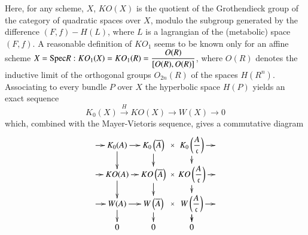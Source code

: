 Here, for any scheme, $X$, $KO(X)$ is the quotient of the Grothendieck group of the category of quadratic spaces over $X$, modulo the subgroup generated by the difference $(F,f)-H(L)$, where $L$ is a lagrangian of the (metabolic) space $(F,f)$. A reasonable definition of $KO_1$ seems to be known only for an affine scheme $X=\mathrm{Spec} R:KO_1(X)=KO_1(R)=\dfrac{O(R)}{[O(R),O(R)]}$, where $O(R)$ denotes the inductive limit of the orthogonal groups $O_{2n}(R)$ of the spaces $H(R^{n})$. Associating to every bundle $P$ over $X$ the hyperbolic space $H(P)$ yields an exact sequence 
$$
K_0(X)\xrightarrow{H}KO(X)\to W(X)\to 0
$$
which, combined with the Mayer-Vietoris sequence, gives a commutative diagram 
$$
\xymatrix@=.3cm{
\ar[r]&K_0(A)\ar[r]\ar[d]&K_0\left(\overline{A}\right)\ar[d]\ar@{}[r]|{\times} & K_0\left(\dfrac{A}{\mathfrak{c}}\right)\ar[r]\ar[d]&\\
\ar[r]&KO(A)\ar[d]\ar[r]&KO\left(\overline{A}\right)\ar[d]\ar@{}[r]|{\times} & KO\left(\dfrac{A}{\mathfrak{c}}\right)\ar[d]\ar[r]&\\
\ar[r]&W(A)\ar[d]\ar[r]&W\left(\overline{A}\right)\ar[d]\ar@{}[r]|{\times} & W\left(\dfrac{A}{\mathfrak{c}}\right)\ar[d]\ar[r]\ar[d]&\\
&0 &0 &0 &}
$$
